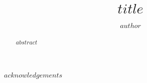 \documentclass[
$if(draft)$
  draft,
$endif$
$if(fontsize)$
  $fontsize$,
$endif$
$if(margins)$
  $margins$,
$endif$
$if(spacing)$
  $spacing$,
$endif$
$if(clearpagestyle)$
  $clearpagestyle$,
$endif$
$if(notespacing)$
  $notespacing$,
$endif$
$for(classoption)$
  $classoption$$sep$,
$endfor$
]{ut-thesis}
\author{$author$}
\title{$title$}
\begin{document}
\begin{preliminary}

\maketitle


\begin{abstract}
$abstract$ %
\end{abstract}





\begin{acknowledgements}
$acknowledgements$ %
\end{acknowledgements}



\end{preliminary}
\end{document}
